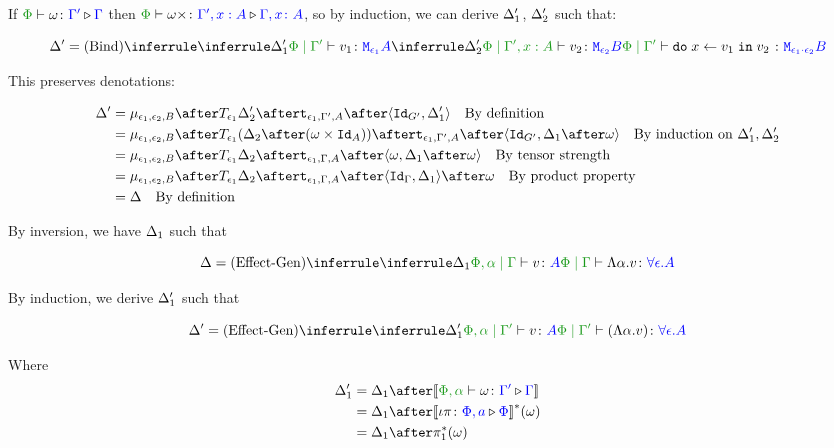 \documentclass{report}
\begin{document}
    If $\ewrel{\P}{\w}{\G'}{\G}$ then $\ewrel{\P}{\w\x}{\G',x:A}{\gax}$, so by induction, we can derive $\Delta_1'$, $\Delta_2'$ such that:

    \begin{equation}
        \D' = \ntreeruleII{Bind}{
            \treeruleI{\D_1'}{\etyperelation{\P}{\G'}{v_1}{\M{\e_1}{A}}}
            }{
            \treeruleI{\D_2'}{\etyperelation{\P}{\G',x: A}{v_2}{\M{\e_2}{B}}}
        }{
            \etyperelation{\P}{\G'}{\doin{x}{v_1}{v_2}}{\M{\e_1\dot\e_2}{B}}
        }
    \end{equation}

    This preserves denotations:

    \begin{align*}
        \D' & = \bind{\e_1}{\e_2}{B}\after\T{\e_1}{\D_2'}\after\tstrength{\e_1}{\G'}{A}\after\pr{\Id{G'}}{\D_1'}\qt{By definition}\\
        & = \bind{\e_1}{\e_2}{B}\after\T{\e_1}{(\D_2\after(\w\times\Id{A}))}\after\tstrength{\e_1}{\G'}{A}\after\pr{\Id{G'}}{\D_1\after\w}\qt{By induction on $\D_1', \D_2'$}\\
        & = \bind{\e_1}{\e_2}{B}\after\T{\e_1}{\D_2}\after\tstrength{\e_1}{\G}{A}\after\pr{\w}{\D_1\after\w}\qt{By tensor strength}\\
        & = \bind{\e_1}{\e_2}{B}\after\T{\e_1}{\D_2}\after\tstrength{\e_1}{\G}{A}\after\pr{\idg}{\D_1}\after\w\qt{By product property}\\
        & = \D \qt{By definition}
    \end{align*}




    By inversion, we have $\Delta_1$ such that
    
    \begin{equation}
        \D = \ntreeruleI{Effect-Gen}{\treeruleI{\D_1}{\etyperelation{\P,\a}{\G}{v}{A}}}{\gpetyperelation{\elam{\a}{v}}{\all{\e}{A}}}
    \end{equation}
    
    By induction, we derive $\Delta_1'$ such that
    
    \begin{equation}
        \D' = \ntreeruleI{Effect-Gen}{\treeruleI{\D_1'}{\etyperelation{\P,\a}{\G'}{v}{A}}}{\etyperelation{\P}{\G'}{(\elam{\a}{v})}{\all{\e}{A}}}
    \end{equation}
    
    Where 
    \begin{align*}
        \D_1' & = \D_1\after\deno{\ewrel{\P,\a}{\w}{\G'}{\G}}\\
        & = \D_1\after\deno{\wrel{\i\pi}{\P,a}{\P}}\star(\w)\\
        & = \D_1\after\pstar(\w)
    \end{align*}
    
\end{document}
